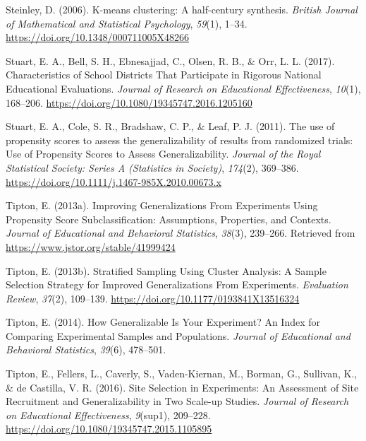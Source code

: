 \documentclass[english,man,floatsintext]{apa6}
\begin{document}
\leavevmode\hypertarget{ref-steinleyKmeansClusteringHalfcentury2006}{}%
Steinley, D. (2006). K-means clustering: A half-century synthesis. \emph{British Journal of Mathematical and Statistical Psychology}, \emph{59}(1), 1--34. \url{https://doi.org/10.1348/000711005X48266}

\leavevmode\hypertarget{ref-stuartCharacteristicsSchoolDistricts2017}{}%
Stuart, E. A., Bell, S. H., Ebnesajjad, C., Olsen, R. B., \& Orr, L. L. (2017). Characteristics of School Districts That Participate in Rigorous National Educational Evaluations. \emph{Journal of Research on Educational Effectiveness}, \emph{10}(1), 168--206. \url{https://doi.org/10.1080/19345747.2016.1205160}

\leavevmode\hypertarget{ref-stuartUsePropensityScores2011}{}%
Stuart, E. A., Cole, S. R., Bradshaw, C. P., \& Leaf, P. J. (2011). The use of propensity scores to assess the generalizability of results from randomized trials: Use of Propensity Scores to Assess Generalizability. \emph{Journal of the Royal Statistical Society: Series A (Statistics in Society)}, \emph{174}(2), 369--386. \url{https://doi.org/10.1111/j.1467-985X.2010.00673.x}

\leavevmode\hypertarget{ref-tiptonImprovingGeneralizationsExperiments2013}{}%
Tipton, E. (2013a). Improving Generalizations From Experiments Using Propensity Score Subclassification: Assumptions, Properties, and Contexts. \emph{Journal of Educational and Behavioral Statistics}, \emph{38}(3), 239--266. Retrieved from \url{https://www.jstor.org/stable/41999424}

\leavevmode\hypertarget{ref-tiptonStratifiedSamplingUsing2013}{}%
Tipton, E. (2013b). Stratified Sampling Using Cluster Analysis: A Sample Selection Strategy for Improved Generalizations From Experiments. \emph{Evaluation Review}, \emph{37}(2), 109--139. \url{https://doi.org/10.1177/0193841X13516324}

\leavevmode\hypertarget{ref-tiptonHowGeneralizableYour2014}{}%
Tipton, E. (2014). How Generalizable Is Your Experiment? An Index for Comparing Experimental Samples and Populations. \emph{Journal of Educational and Behavioral Statistics}, \emph{39}(6), 478--501.

\leavevmode\hypertarget{ref-tiptonSiteSelectionExperiments2016}{}%
Tipton, E., Fellers, L., Caverly, S., Vaden-Kiernan, M., Borman, G., Sullivan, K., \& de Castilla, V. R. (2016). Site Selection in Experiments: An Assessment of Site Recruitment and Generalizability in Two Scale-up Studies. \emph{Journal of Research on Educational Effectiveness}, \emph{9}(sup1), 209--228. \url{https://doi.org/10.1080/19345747.2015.1105895}
\end{document}
